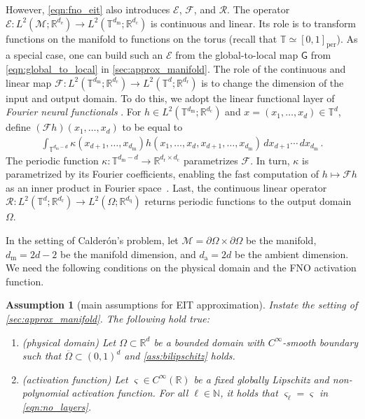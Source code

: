 \documentclass[pdflatex,sn-mathphys-num]{sn-jnl-preprint}
\newcommand{\N}{\mathbb{N}}
\newcommand{\R}{\mathbb{R}}
\newcommand{\T}{\mathbb{T}}
\newcommand{\cF}{\mathcal{F}}
\newcommand{\cR}{\mathcal{R}}
\newcommand{\cE}{\mathcal{E}}
\newcommand{\cM}{\mathcal{M}}
\newcommand{\sfG}{\mathsf{G}}
\newcommand{\pOmega}{{\partial\Omega}}
\newcommand{\diff}{d}
\newcommand{\dd}[1]{\,\diff{#1}}
\newcommand{\sfit}[1]{\textsf{\small{#1}}} %
\theoremstyle{thmstyleone}%
\theoremstyle{thmstyletwo}%
\theoremstyle{thmstylethree}%
\newtheorem{assumption}{Assumption}%
\numberwithin{equation}{section}
\numberwithin{theorem}{section}
\begin{document}
However, \eqref{eqn:fno_eit} also introduces $\cE$, $\cF$, and $\cR$.
The operator $\cE\colon L^2(\cM;\R^{d_{\mathrm{e}}})\to L^2(\T^{d_\mathrm{m}};\R^{d_{\mathrm{c}}})$ is continuous and linear. Its role is to transform functions on the manifold to functions on the torus (recall that $\T\simeq[0,1]_{\mathrm{per}}$). As a special case, one can build such an $\cE$ from the global-to-local map $\sfG$ from \eqref{eqn:global_to_local} in \cref{sec:approx_manifold}.
The role of the continuous and linear map $\cF\colon  L^2(\T^{d_\mathrm{m}};\R^{d_{\mathrm{c}}})\to L^2(\T^{d};\R^{d_{\mathrm{r}}})$ is to change the dimension of the input and output domain. To do this, we adopt the linear functional layer of \emph{Fourier neural functionals} \cite{huang2025operator}. For $h\in L^2(\T^{d_\mathrm{m}};\R^{d_{\mathrm{c}}})$ and $x=(x_1,\ldots, x_d)\in\T^d$, define $(\cF h)(x_1,\ldots, x_d)$ to be equal to
\begin{align}\label{eqn:functional_layer}
    \int_{\T^{d_\mathrm{m}-d}} \kappa(x_{d+1},\ldots, x_{d_\mathrm{m}})h(x_1,\ldots, x_d, x_{d+1},\ldots, x_{d_\mathrm{m}})\dd{x_{d+1}}\cdots \dd{x_{d_\mathrm{m}}}\,.
\end{align}
The periodic function $\kappa\colon\T^{d_\mathrm{m}-d}\to\R^{d_\mathrm{r}\times d_\mathrm{c}}$ parametrizes $\cF$. In turn, $\kappa$ is parametrized by its Fourier coefficients, enabling the fast computation of $h\mapsto \cF h$ as an inner product in Fourier space~\cite[Sec.~2.2, Eqn.~6, p.~7]{huang2025operator}.
Last, the continuous linear operator $\cR\colon L^2(\T^{d};\R^{d_{\mathrm{r}}})\to L^2(\Omega;\R^{d_{\mathrm{q}}})$ returns periodic functions to the output domain $\Omega$.

In the setting of Calder\'on's problem, let $\cM=\pOmega\times\pOmega$ be the manifold, $d_\mathrm{m}=2d-2$ be the manifold dimension, and $d_\mathrm{a}=2d$ be the ambient dimension. We need the following conditions on the physical domain and the FNO activation function.
\begin{assumption}[main assumptions for EIT approximation]\label{assump:main}
    Instate the setting of \cref{sec:approx_manifold}. The following hold true:
    \begin{enumerate}[label=(A-\Roman*),leftmargin=2.5\parindent,topsep=1.67ex,itemsep=0.5ex,partopsep=1ex,parsep=1ex]
        \item \sfit{(physical domain)}\label{item:ass_domain} Let $\Omega\subset\R^d$ be a bounded domain with $C^\infty$-smooth boundary such that $\overline{\Omega}\subset (0,1)^d$ and \cref{ass:bilipschitz} holds.

        \item \sfit{(activation function)}\label{item:ass_act} Let $\varsigma \in C^\infty(\R)$ be a fixed globally Lipschitz and non-polynomial activation function. For all $\ell\in\N$, it holds that $\varsigma_\ell=\varsigma$ in \eqref{eqn:no_layers}.
    \end{enumerate}
\end{assumption}
\end{document}
